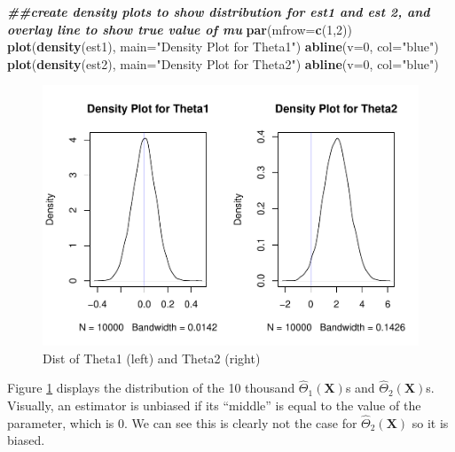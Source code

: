 \documentclass[
]{book}
\newenvironment{Shaded}{\begin{snugshade}}{\end{snugshade}}
\newcommand{\AttributeTok}[1]{\textcolor[rgb]{0.13,0.29,0.53}{#1}}
\newcommand{\DecValTok}[1]{\textcolor[rgb]{0.00,0.00,0.81}{#1}}
\newcommand{\DocumentationTok}[1]{\textcolor[rgb]{0.56,0.35,0.01}{\textbf{\textit{#1}}}}
\newcommand{\FunctionTok}[1]{\textcolor[rgb]{0.13,0.29,0.53}{\textbf{#1}}}
\newcommand{\NormalTok}[1]{#1}
\newcommand{\StringTok}[1]{\textcolor[rgb]{0.31,0.60,0.02}{#1}}
\begin{document}
\begin{Shaded}
\begin{Highlighting}[]
\DocumentationTok{\#\#create density plots to show distribution for est1 and est 2, and overlay line to show true value of mu}
\FunctionTok{par}\NormalTok{(}\AttributeTok{mfrow=}\FunctionTok{c}\NormalTok{(}\DecValTok{1}\NormalTok{,}\DecValTok{2}\NormalTok{))}
\FunctionTok{plot}\NormalTok{(}\FunctionTok{density}\NormalTok{(est1), }\AttributeTok{main=}\StringTok{"Density Plot for Theta1"}\NormalTok{)}
\FunctionTok{abline}\NormalTok{(}\AttributeTok{v=}\DecValTok{0}\NormalTok{, }\AttributeTok{col=}\StringTok{"blue"}\NormalTok{)}
\FunctionTok{plot}\NormalTok{(}\FunctionTok{density}\NormalTok{(est2), }\AttributeTok{main=}\StringTok{"Density Plot for Theta2"}\NormalTok{)}
\FunctionTok{abline}\NormalTok{(}\AttributeTok{v=}\DecValTok{0}\NormalTok{, }\AttributeTok{col=}\StringTok{"blue"}\NormalTok{)}
\end{Highlighting}
\end{Shaded}

\begin{figure}
\centering
\includegraphics{bookdown-demo_files/figure-latex/7-bias-1.pdf}
\caption{\label{fig:7-bias}Dist of Theta1 (left) and Theta2 (right)}
\end{figure}

Figure \ref{fig:7-bias} displays the distribution of the 10 thousand \(\hat{\Theta}_1(\boldsymbol{X})\)s and \(\hat{\Theta}_2(\boldsymbol{X})\)s. Visually, an estimator is unbiased if its ``middle'' is equal to the value of the parameter, which is 0. We can see this is clearly not the case for \(\hat{\Theta}_2(\boldsymbol{X})\) so it is biased.
\end{document}
